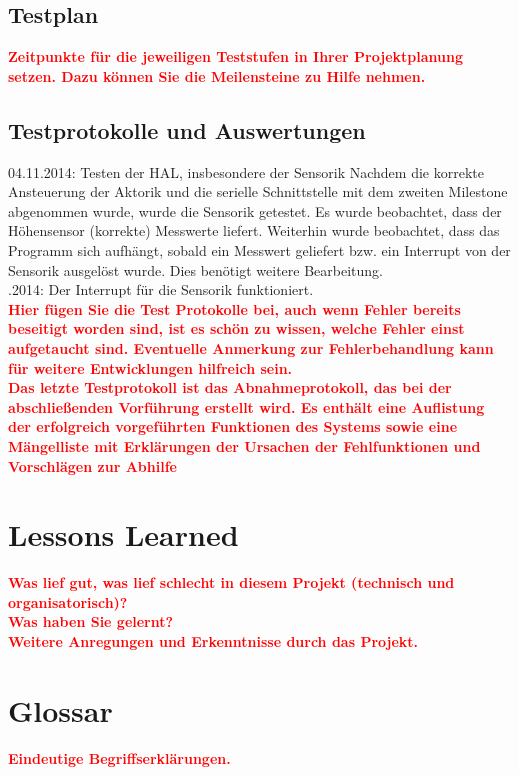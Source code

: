 \documentclass[oneside,a4paper,titlepage]{scrartcl} %
\begin{document}
\subsection{Testplan}
\textcolor{red}{\textbf{Zeitpunkte für die jeweiligen Teststufen in Ihrer Projektplanung setzen.
Dazu können Sie die Meilensteine zu Hilfe nehmen.}}

\subsection{Testprotokolle und Auswertungen}
04.11.2014: Testen der HAL, insbesondere der Sensorik \newline
Nachdem die korrekte Ansteuerung der Aktorik und die serielle Schnittstelle mit dem zweiten Milestone abgenommen wurde, wurde die Sensorik getestet. Es wurde beobachtet, dass der Höhensensor (korrekte) Messwerte liefert. Weiterhin wurde beobachtet, dass das Programm sich aufhängt, sobald ein Messwert geliefert bzw. ein Interrupt von der Sensorik ausgelöst wurde. Dies benötigt weitere Bearbeitung.\\
.2014: Der Interrupt für die Sensorik funktioniert.\\
\newline
\textcolor{red}{\textbf{Hier fügen Sie die Test Protokolle bei, auch wenn Fehler bereits beseitigt
worden sind, ist es schön zu wissen, welche Fehler einst aufgetaucht sind.
Eventuelle Anmerkung zur Fehlerbehandlung kann für weitere Entwicklungen hilfreich sein.\\
Das letzte Testprotokoll ist das Abnahmeprotokoll, das bei der abschließenden Vorführung erstellt
wird. Es enthält eine Auflistung der erfolgreich vorgeführten Funktionen des Systems sowie eine
Mängelliste mit Erklärungen der Ursachen der Fehlfunktionen und Vorschlägen zur Abhilfe}}

\section{Lessons Learned}
\textcolor{red}{\textbf{Was lief gut, was lief schlecht in diesem Projekt (technisch und organisatorisch)?\\
Was haben Sie gelernt?\\
Weitere Anregungen und Erkenntnisse durch das Projekt.}}

\newpage

\section{Glossar}
\textcolor{red}{\textbf{Eindeutige Begriffserklärungen.}}
\end{document}

